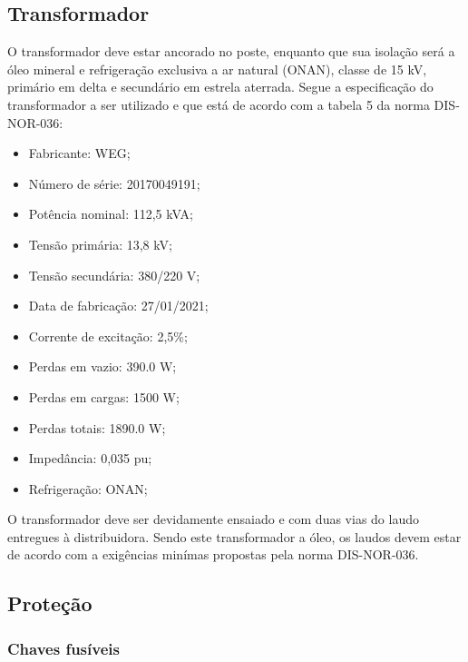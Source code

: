 \subsection{Transformador} 

O transformador deve estar ancorado no poste, enquanto que sua isolação será a óleo mineral e refrigeração exclusiva a ar natural (ONAN), classe de 15 kV, primário em delta e secundário em estrela aterrada. Segue a especificação do transformador a ser utilizado e que está de acordo com a tabela 5 da norma DIS-NOR-036:

\begin{itemize}
    \item Fabricante: WEG;
    \item Número de série: 20170049191;
    \item Potência nominal: 112,5 kVA;
    \item Tensão primária: 13,8 kV;
    \item Tensão secundária: 380/220 V;
    \item Data de fabricação: 27/01/2021;
    \item Corrente de excitação: 2,5\%;
    \item Perdas em vazio: 390.0 W;
    \item Perdas em cargas: 1500 W;
    \item Perdas totais: 1890.0 W;
    \item Impedância: 0,035 pu;
    \item Refrigeração: ONAN;
\end{itemize}


O transformador deve ser devidamente ensaiado e com duas vias do laudo entregues à distribuidora. Sendo este transformador a óleo, os laudos devem estar de acordo com a exigências minímas propostas pela norma DIS-NOR-036.



\subsection{Proteção}

\subsubsection{Chaves fusíveis}

